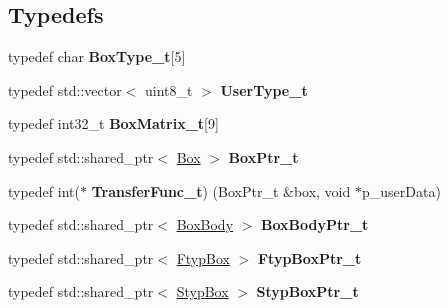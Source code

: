 \subsection*{Typedefs}
\begin{DoxyCompactItemize}
\item 
\mbox{\label{namespacemp4_parser_a45522ceeeeb8b239314b9f815392768e}} 
typedef char {\bfseries Box\+Type\+\_\+t}\mbox{[}5\mbox{]}
\item 
\mbox{\label{namespacemp4_parser_a22bbf97180b8c8a83e73c866f2f1cdf1}} 
typedef std\+::vector$<$ uint8\+\_\+t $>$ {\bfseries User\+Type\+\_\+t}
\item 
\mbox{\label{namespacemp4_parser_aa52b9f10faa98e7029b4ab5b5ec76681}} 
typedef int32\+\_\+t {\bfseries Box\+Matrix\+\_\+t}\mbox{[}9\mbox{]}
\item 
\mbox{\label{namespacemp4_parser_af5f9d42e22fd0cdd44c61d435b140329}} 
typedef std\+::shared\+\_\+ptr$<$ \mbox{\hyperlink{classmp4_parser_1_1_box}{Box}} $>$ {\bfseries Box\+Ptr\+\_\+t}
\item 
\mbox{\label{namespacemp4_parser_af65327005a2df0a3a63d2ae090fb055e}} 
typedef int($\ast$ {\bfseries Transfer\+Func\+\_\+t}) (Box\+Ptr\+\_\+t \&box, void $\ast$p\+\_\+user\+Data)
\item 
\mbox{\label{namespacemp4_parser_a1f8b096edd8f2758c0fa103e1c4099b9}} 
typedef std\+::shared\+\_\+ptr$<$ \mbox{\hyperlink{structmp4_parser_1_1_box_body}{Box\+Body}} $>$ {\bfseries Box\+Body\+Ptr\+\_\+t}
\item 
\mbox{\label{namespacemp4_parser_aef07aec389019428947b59abc3ce319c}} 
typedef std\+::shared\+\_\+ptr$<$ \mbox{\hyperlink{classmp4_parser_1_1_ftyp_box}{Ftyp\+Box}} $>$ {\bfseries Ftyp\+Box\+Ptr\+\_\+t}
\item 
\mbox{\label{namespacemp4_parser_a537a54d361ee3b4742b8e7c1848ef7cc}} 
typedef std\+::shared\+\_\+ptr$<$ \mbox{\hyperlink{classmp4_parser_1_1_styp_box}{Styp\+Box}} $>$ {\bfseries Styp\+Box\+Ptr\+\_\+t}
\item 
\mbox{\label{namespacemp4_parser_a2385cad44c4e60a7b51cdc210505c3f9}} 

\end{DoxyCompactItemize}
